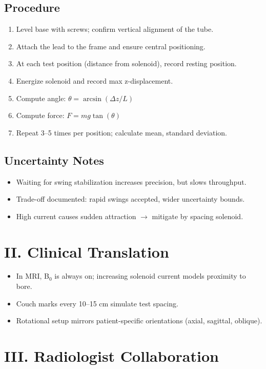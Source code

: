 \documentclass[12pt]{article}
\begin{document}
	\subsection*{Procedure}
	\begin{enumerate}
		\item Level base with screws; confirm vertical alignment of the tube.
		\item Attach the lead to the frame and ensure central positioning.
		\item At each test position (distance from solenoid), record resting position.
		\item Energize solenoid and record max z-displacement.
		\item Compute angle: $\theta = \arcsin(\Delta z / L)$
		\item Compute force: $F = mg \tan(\theta)$
		\item Repeat 3--5 times per position; calculate mean, standard deviation.
	\end{enumerate}
	
	\subsection*{Uncertainty Notes}
	\begin{itemize}
		\item Waiting for swing stabilization increases precision, but slows throughput.
		\item Trade-off documented: rapid swings accepted, wider uncertainty bounds.
		\item High current causes sudden attraction $\rightarrow$ mitigate by spacing solenoid.
	\end{itemize}
	
	\section{II. Clinical Translation}
	\begin{itemize}
		\item In MRI, B$_0$ is always on; increasing solenoid current models proximity to bore.
		\item Couch marks every 10--15 cm simulate test spacing.
		\item Rotational setup mirrors patient-specific orientations (axial, sagittal, oblique).
	\end{itemize}
	
	\section{III. Radiologist Collaboration}
\end{document}
